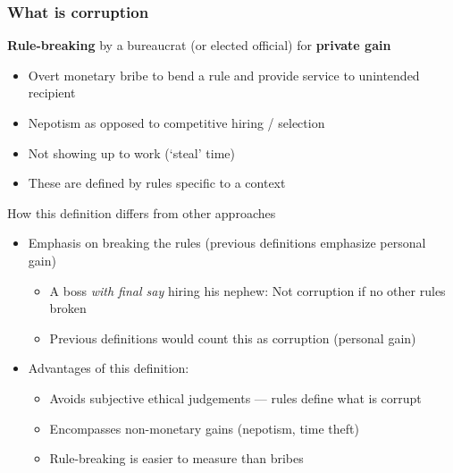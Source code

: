 \documentclass[aspectratio=169]{beamer}
\begin{document}
\begin{frame}
\frametitle{What is corruption} 
\textbf{Rule-breaking} by a bureaucrat (or elected official) for \textbf{private gain}
\begin{itemize}\setlength\itemsep{3pt}
\item Overt monetary bribe to bend a rule and provide service to unintended recipient
\item Nepotism as opposed to competitive hiring / selection
\item Not showing up to work (`steal' time)

\item These are defined by rules specific to a context
\end{itemize}\medskip
How this definition differs from other approaches
\begin{itemize}\setlength\itemsep{3pt}
\item Emphasis on breaking the rules (previous definitions emphasize personal gain)
\begin{itemize}\setlength\itemsep{3pt}
\item A boss \textit{with final say} hiring his nephew: Not corruption if no other rules broken
\item Previous definitions would count this as corruption (personal gain)
\end{itemize}
\item Advantages of this definition:
\begin{itemize}\setlength\itemsep{3pt}
\item Avoids subjective ethical judgements — rules define what is corrupt
\item Encompasses non-monetary gains (nepotism, time theft)
\item Rule-breaking is easier to measure than bribes
\end{itemize}
\end{itemize}
\end{frame}
\end{document}
